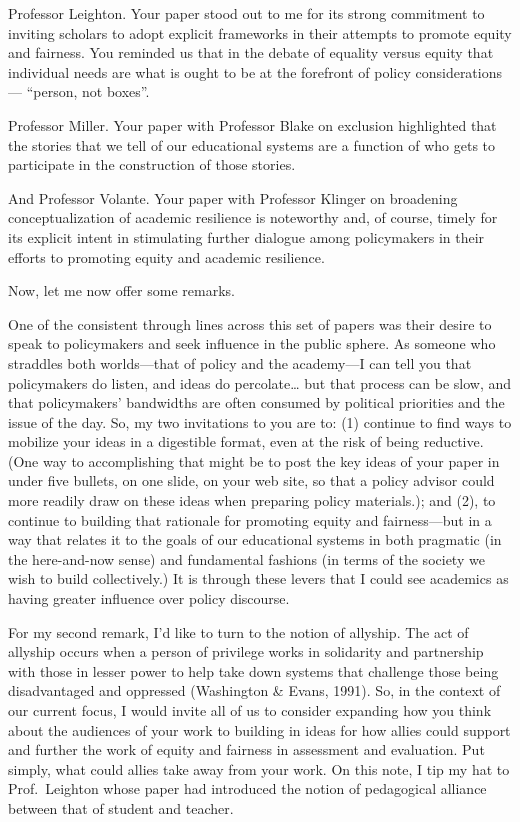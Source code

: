 \documentclass[
]{book}
\begin{document}
Professor Leighton. Your paper stood out to me for its strong commitment to inviting scholars to adopt explicit frameworks in their attempts to promote equity and fairness. You reminded us that in the debate of equality versus equity that individual needs are what is ought to be at the forefront of policy considerations--- ``person, not boxes''.

Professor Miller. Your paper with Professor Blake on exclusion highlighted that the stories that we tell of our educational systems are a function of who gets to participate in the construction of those stories.

And Professor Volante. Your paper with Professor Klinger on broadening conceptualization of academic resilience is noteworthy and, of course, timely for its explicit intent in stimulating further dialogue among policymakers in their efforts to promoting equity and academic resilience.

Now, let me now offer some remarks.

One of the consistent through lines across this set of papers was their desire to speak to policymakers and seek influence in the public sphere. As someone who straddles both worlds---that of policy and the academy---I can tell you that policymakers do listen, and ideas do percolate\ldots{} but that process can be slow, and that policymakers' bandwidths are often consumed by political priorities and the issue of the day. So, my two invitations to you are to: (1) continue to find ways to mobilize your ideas in a digestible format, even at the risk of being reductive. (One way to accomplishing that might be to post the key ideas of your paper in under five bullets, on one slide, on your web site, so that a policy advisor could more readily draw on these ideas when preparing policy materials.); and (2), to continue to building that rationale for promoting equity and fairness---but in a way that relates it to the goals of our educational systems in both pragmatic (in the here-and-now sense) and fundamental fashions (in terms of the society we wish to build collectively.) It is through these levers that I could see academics as having greater influence over policy discourse.

For my second remark, I'd like to turn to the notion of allyship. The act of allyship occurs when a person of privilege works in solidarity and partnership with those in lesser power to help take down systems that challenge those being disadvantaged and oppressed (Washington \& Evans, 1991). So, in the context of our current focus, I would invite all of us to consider expanding how you think about the audiences of your work to building in ideas for how allies could support and further the work of equity and fairness in assessment and evaluation. Put simply, what could allies take away from your work. On this note, I tip my hat to Prof.~Leighton whose paper had introduced the notion of pedagogical alliance between that of student and teacher.
\end{document}
